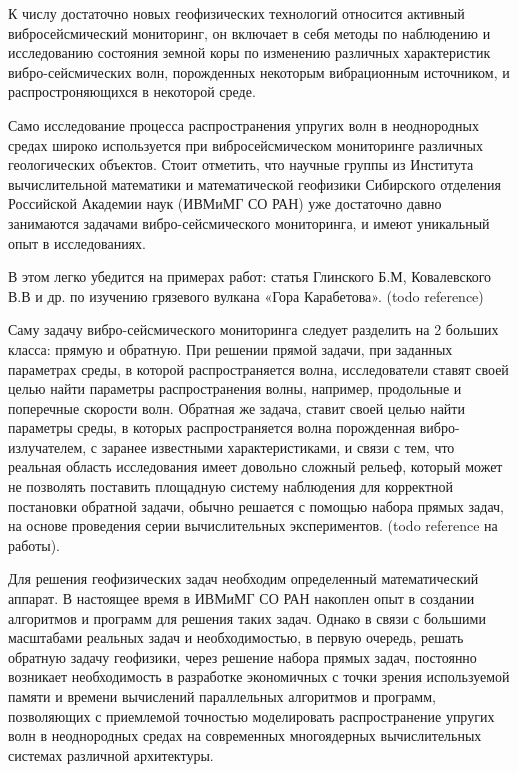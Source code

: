 
К числу достаточно новых геофизических технологий относится активный вибросейсмический мониторинг, 
он включает в себя методы по наблюдению и исследованию состояния земной коры по изменению 
различных характеристик вибро-сейсмических волн, порожденных некоторым вибрационным источником, 
и распростроняющихся в некоторой среде. 

Само исследование процесса распространения упругих волн в неоднородных средах широко
используется при вибросейсмическом мониторинге различных геологических объектов.
Стоит отметить, что научные группы из Института
вычислительной математики и математической геофизики Сибирского
отделения Российской Академии наук (ИВМиМГ СО РАН) уже достаточно давно занимаются
задачами вибро-сейсмического мониторинга, и имеют уникальный опыт в исследованиях.

В этом легко убедится на примерах работ: статья Глинского Б.М, Ковалевского В.В и др. по изучению грязевого вулкана «Гора Карабетова». (todo reference)

Саму задачу вибро-сейсмического мониторинга следует разделить на 2 больших класса: прямую и обратную.
При решении прямой задачи, при заданных параметрах среды, в которой распространяется волна, 
исследователи ставят своей целью найти параметры распространения волны, например, 
продольные и поперечные скорости волн. Обратная же задача, ставит своей целью найти параметры среды, 
в которых распространяется волна порожденная вибро-излучателем, с заранее известными характеристиками, 
и связи с тем, что реальная область исследования имеет довольно сложный рельеф,
который может не позволять поставить площадную систему наблюдения для корректной постановки обратной задачи,
обычно решается с помощью набора прямых задач, на основе проведения серии вычислительных
экспериментов. (todo reference на работы).

Для решения геофизических задач необходим определенный математический аппарат. 
В настоящее время в ИВМиМГ СО РАН накоплен опыт в создании алгоритмов и программ для решения таких задач.
Однако в связи с большими масштабами реальных задач и необходимостью, в первую очередь, решать обратную
задачу геофизики, через решение набора прямых задач, постоянно возникает необходимость в
разработке экономичных с точки зрения используемой памяти и времени вычислений
параллельных алгоритмов и программ, позволяющих с приемлемой точностью
моделировать распространение упругих волн в неоднородных средах на 
современных многоядерных вычислительных системах различной архитектуры.

